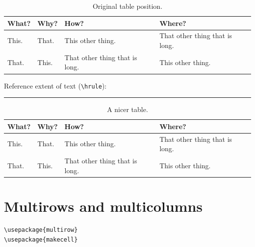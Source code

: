 \documentclass[11pt,a4paper,english,twoside,notitlepage,openright]{article}
\begin{document}
\begin{table}[!h]
\caption{Original table position.}
\label{tab:lab}
\begin{center}
\begin{tabular}{p{2cm}|p{2cm}|p{5cm}|p{5cm}}
\textbf{What?}    &    \textbf{Why?}    &    \textbf{How?}     &    \textbf{Where?}\\ \hline
This.             & That.               &    This other thing. & That other thing that is long. \\
That.             & This.               &    That other thing that is long. & This other thing. \\
\end{tabular}
\end{center}
\end{table}

Reference extent of text (\verb|\hrule|): \vspace{0.1cm}
\hrule
\begin{table}[!h]
\caption{A nicer table.}
\label{tab:lab}
\begin{center}
\hspace*{-1.3cm}
\begin{tabular}{p{2cm}|p{2cm}|p{5cm}|p{5cm}}
\textbf{What?}    &    \textbf{Why?}    &    \textbf{How?}     &    \textbf{Where?}\\ \hline
This.             & That.               &    This other thing. & That other thing that is long. \\
That.             & This.               &    That other thing that is long. & This other thing. \\
\end{tabular}
\end{center}
\end{table}

\section{Multirows and multicolumns}

\begin{verbatim}
\usepackage{multirow}
\usepackage{makecell}
\end{verbatim}
\end{document}
